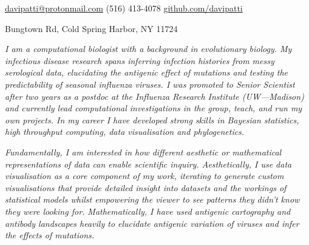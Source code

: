 \documentclass[10pt,a4paper]{article}
\begin{document}
\sloppy  %


\nobreakvspace{0.3em}  %

\noindent\href{mailto:davipatti@protonmail.com}{davipatti\mbox{}@\mbox{}protonmail.com}\sbull
{} (516) 413-4078\sbull
\href{https://github.com/davipatti}{github.com/davipatti}
\par {} Bungtown Rd, Cold Spring Harbor, NY 11724

\spacedhrule{0.5em}{-0.4em}  %

 \begin{multicols}{2}
  \emph{ I am a computational biologist with a background in evolutionary
  biology. My infectious disease research spans inferring infection histories from messy
  serological data, elucidating the antigenic effect of mutations and testing the
  predictability of seasonal influenza viruses. I was promoted to Senior Scientist after
  two years as a postdoc at the Influenza Research Institute (UW---Madison) and currently
  lead computational investigations in the group, teach, and run my own projects. In
  my career I have developed strong skills in Bayesian statistics, high throughput
  computing, data visualisation and phylogenetics. }

  \emph{
  Fundamentally, I am interested in how different aesthetic or mathematical
  representations of data can enable scientific inquiry. Aesthetically, I use data
  visualisation as a core component of my work, iterating to generate custom
  visualisations that provide detailed insight into datasets and the workings of
  statistical models whilst empowering the viewer to see patterns they didn't know they
  were looking for. Mathematically, I have used antigenic cartography and antibody
  landscapes heavily to elucidate antigenic variation of viruses and infer the effects of
  mutations.
  }
\end{multicols}

\spacedhrule{0.9em}{-0.4em}

\end{document}
